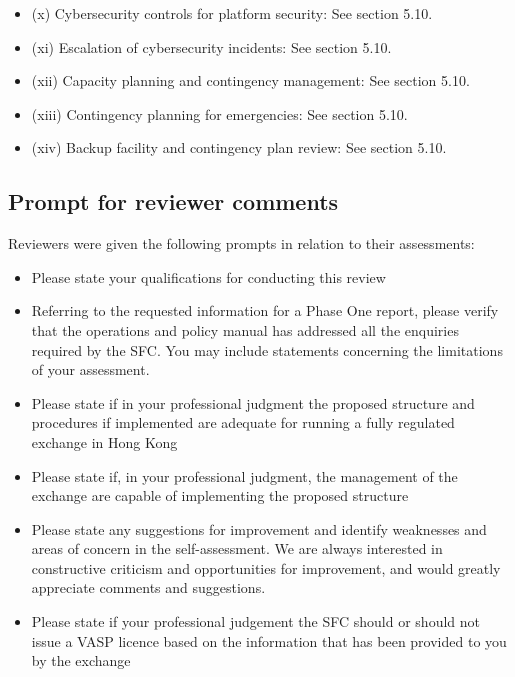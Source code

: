 \documentclass[]{report}
\begin{document}
\begin{itemize}
\begin{itemize}
\item (x) Cybersecurity controls for platform security: See section 5.10.
\item (xi) Escalation of cybersecurity incidents: See section 5.10.
\item (xii) Capacity planning and contingency management: See section 5.10.
\item (xiii) Contingency planning for emergencies: See section 5.10.
\item (xiv) Backup facility and contingency plan review: See section
  5.10.
\end{itemize}
\end{itemize}

\subsection{Prompt for reviewer comments}
Reviewers were given the following prompts in relation to their
assessments:

\begin{itemize}
\item  Please state your qualifications for conducting this review

\item Referring to the requested information for a Phase One report,
  please verify that the operations and policy manual has addressed
  all the enquiries required by the SFC.  You may include statements
  concerning the limitations of your assessment.

\item Please state if in your professional judgment the proposed
  structure and procedures if implemented are adequate for running a
  fully regulated exchange in Hong Kong

\item Please state if, in your professional judgment, the management
  of the exchange are capable of implementing the proposed structure

\item Please state any suggestions for improvement and identify
  weaknesses and areas of concern in the self-assessment.  We are
  always interested in constructive criticism and opportunities for
  improvement, and would greatly appreciate comments and suggestions.

\item Please state if your professional judgement the SFC should or
  should not issue a VASP licence based on the information that has
  been provided to you by the exchange
\end{itemize}
\end{document}
